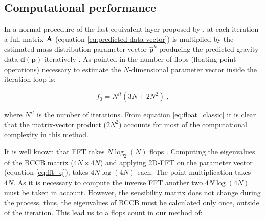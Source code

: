 \documentclass[manuscript,revised]{geophysics}
\begin{document}
%
%
%
%
%
%
%
%


\subsection{Computational performance}
In a normal procedure of the fast equivalent layer proposed by \citet{siqueira-etal2017}, at each iteration a full matrix $\tensor{A}$ (equation \ref{eq:predicted-data-vector}) is multiplied by the estimated mass distribution parameter vector $\hat{\mathbf{p}}^k$ producing the predicted gravity data $\mathbf{d(p)}$  iteratively . As pointed in \citet{siqueira-etal2017} the number of flops (floating-point operations) necessary to estimate the $N$-dimensional parameter vector inside the iteration loop is:

\begin{equation}
f_0 = N^{it} (3N + 2N^2) \; ,
\label{eq:float_classic}
\end{equation}

\noindent where $N^{it}$ is the number of iterations. From equation \ref{eq:float_classic} it is clear that the matrix-vector product ($2N^2$) accounts for most of the computational complexity in this method.

It is well known that FFT takes $N \log_2(N)$ flops \cite[]{brigham1988fast}. Computing the eigenvalues of the BCCB matrix ($4N \times 4N$) and applying 2D-FFT on the parameter vector (equation \ref{eq:fft_q}), takes $4N \log(4N)$ each. The point-multiplication takes $4N$. As it is necessary to compute the inverse FFT another two $4N \log(4N)$ must be taken in account. However, the sensibility matrix does not change during the process, thus, the eigenvalues of BCCB must be calculated only once, outside of the iteration. This lead us to a flops count in our method of:
\end{document}
